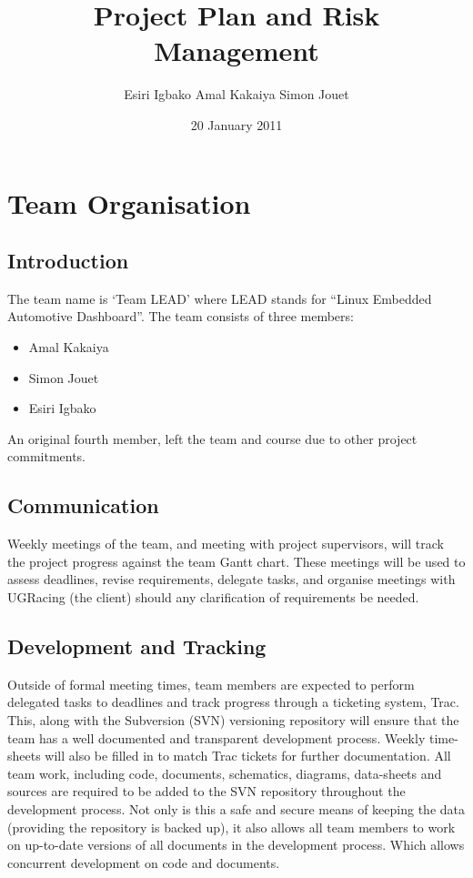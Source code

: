 \documentclass{article}
\title{Project Plan and Risk Management}
\author{Esiri Igbako
        Amal Kakaiya
        Simon Jouet\\
        }
\date{20 January 2011}
\begin{document}
\maketitle

\tableofcontents

\newpage

\section{Team Organisation}
\subsection{Introduction}
The team name is ‘Team LEAD’ where LEAD stands for “Linux Embedded Automotive
Dashboard”. The team consists of three members:
\begin{itemize}
	\item Amal Kakaiya
	\item Simon Jouet
	\item Esiri Igbako
\end{itemize} 

An original fourth member, left the team and course due to other project commitments.

\subsection{Communication}
Weekly meetings of the team, and meeting with project supervisors, will track
the project progress against the team Gantt chart. These meetings will be used 
to assess deadlines, revise requirements, delegate tasks, and organise meetings 
with UGRacing (the client) should any clarification of requirements be needed.

\subsection{Development and Tracking}
Outside of formal meeting times, team members are expected to perform delegated 
tasks to deadlines and track progress through a ticketing system, Trac. This, 
along with the Subversion (SVN) versioning repository will ensure that the team 
has a well documented and transparent development process. Weekly time-sheets 
will also be filled in to match Trac tickets for further documentation. All 
team work, including code, documents, schematics, diagrams, data-sheets and 
sources are required to be added to the SVN repository throughout the 
development process. Not only is this a safe and secure means of keeping the 
data (providing the repository is backed up), it also allows all team members 
to work on up-to-date versions of all documents in the development process. 
Which allows concurrent development on code and documents.
\end{document}

